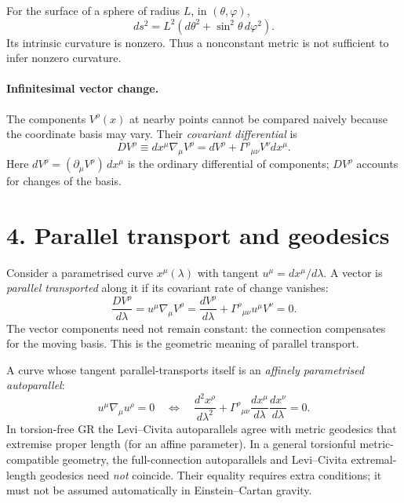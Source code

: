\documentclass[10pt,a4paper]{article}
\begin{document}
For the surface of a sphere of radius $L$, in $(\theta,\varphi)$,
\begin{equation}
ds^2=L^2(d\theta^2+\sin^2\theta\,d\varphi^2).
\end{equation}
Its intrinsic curvature is nonzero. Thus a nonconstant metric is not sufficient to infer nonzero curvature.

\paragraph{Infinitesimal vector change.}
The components $V^\rho(x)$ at nearby points cannot be compared naively because the coordinate basis may vary. Their \emph{covariant differential} is
\begin{equation}
DV^\rho \equiv dx^\mu\nabla_\mu V^\rho
=dV^\rho+\Gamma^\rho{}_{\mu\nu}V^\nu dx^\mu.
\end{equation}
Here $dV^\rho=(\partial_\mu V^\rho)\,dx^\mu$ is the ordinary differential of components; $DV^\rho$ accounts for changes of the basis.

\section*{4. Parallel transport and geodesics}
Consider a parametrised curve $x^\mu(\lambda)$ with tangent
$u^\mu=dx^\mu/d\lambda$. A vector is \emph{parallel transported} along it if its covariant rate of change vanishes:
\begin{equation}
\boxed{\frac{DV^\rho}{d\lambda}
=u^\mu\nabla_\mu V^\rho
=\frac{dV^\rho}{d\lambda}
+\Gamma^\rho{}_{\mu\nu}u^\mu V^\nu=0.}
\end{equation}
The vector components need not remain constant: the connection compensates for the moving basis. This is the geometric meaning of parallel transport.

A curve whose tangent parallel-transports itself is an \emph{affinely parametrised autoparallel}:
\begin{equation}
u^\mu\nabla_\mu u^\rho=0
\quad\Longleftrightarrow\quad
\boxed{\frac{d^2x^\rho}{d\lambda^2}
+\Gamma^\rho{}_{\mu\nu}
\frac{dx^\mu}{d\lambda}\frac{dx^\nu}{d\lambda}=0.}
\end{equation}
In torsion-free GR the Levi--Civita autoparallels agree with metric geodesics that extremise proper length (for an affine parameter). In a general torsionful metric-compatible geometry, the full-connection autoparallels and Levi--Civita extremal-length geodesics need \emph{not} coincide. Their equality requires extra conditions; it must not be assumed automatically in Einstein--Cartan gravity.
\end{document}
